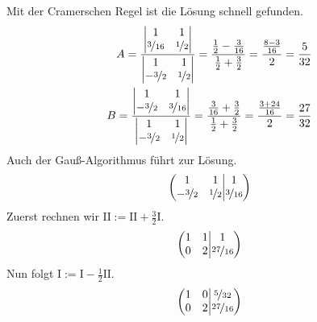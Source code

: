 \documentclass[11pt,a4paper,DIV=12]{scrartcl}
\begin{document}
%
Mit der Cramerschen Regel ist die Lösung schnell gefunden.
%
\begin{align}
	A = 
	\frac{
		\begin{vmatrix}
			1 & 1\\
			\nicefrac{3}{16} & \nicefrac{1}{2}
		\end{vmatrix}
	}
	{
		\begin{vmatrix}
			1 & 1\\
			-\nicefrac{3}{2} & \nicefrac{1}{2}
	\end{vmatrix}
	}
	=\frac{\frac{1}{2}-\frac{3}{16}}{\frac{1}{2}+\frac{3}{2}}=\frac{\frac{8-3}{16}}{2}=\frac{5}{32}\\
	B=
	\frac{
		\begin{vmatrix}
			1 &  1\\
			-\nicefrac{3}{2} & \nicefrac{3}{16}
		\end{vmatrix}
	}
	{
		\begin{vmatrix}
			1 & 1\\
			-\nicefrac{3}{2} & \nicefrac{1}{2}
	\end{vmatrix}
	}
	=\frac{\frac{3}{16}+\frac{3}{2}}{\frac{1}{2}+\frac{3}{2}}=\frac{\frac{3+24}{16}}{2}=\frac{27}{32}
\end{align}
%
%
%
Auch der Gauß-Algorithmus führt zur Lösung.
%
%
\begin{gather}
	\left\lparen
	\begin{matrix}
		1 & 1 \\
		-\nicefrac{3}{2}&\nicefrac{1}{2}
	\end{matrix}
	\middle\vert
	\begin{matrix}
		1 \\
		\nicefrac{3}{16}
	\end{matrix}
	\right\rparen
\end{gather}
%
%
Zuerst rechnen wir $\mathrm{II}:=\mathrm{II}+\frac{3}{2}\mathrm{I}$.
%
%
\begin{gather}
	\left\lparen
	\begin{matrix}
		1 & 1 \\
		0&2
	\end{matrix}
	\middle\vert
	\begin{matrix}
		1 \\
		\nicefrac{27}{16}
	\end{matrix}
	\right\rparen
\end{gather}
%
%
Nun folgt $\mathrm{I}:=\mathrm{I}-\frac{1}{2}\mathrm{II}$.
%
%
\begin{gather}
	\left\lparen
	\begin{matrix}
		1 & 0 \\
		0&2
	\end{matrix}
	\middle\vert
	\begin{matrix}
		\nicefrac{5}{32} \\
		\nicefrac{27}{16}
	\end{matrix}
	\right\rparen
\end{gather}
\end{document}
